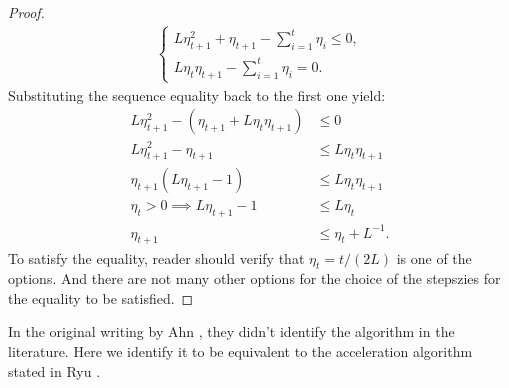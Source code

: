 \documentclass[12pt]{article}
\begin{document}
\begin{proof}
            \begin{align*}
                \begin{cases}
                    L\eta_{t + 1}^2 + \eta_{t + 1} - \sum_{i = 1}^{t}\eta_i 
                    \le 0, 
                    \\
                    L\eta_t \eta_{t + 1} - \sum_{i = 1}^{t} \eta_i 
                    = 0. 
                \end{cases}
            \end{align*}
            Substituting the sequence equality back to the first one yield: 
            \begin{align*}
                L\eta_{t + 1}^2 - (\eta_{t + 1} + L\eta_t\eta_{t + 1}) &\le 0 
                \\
                L\eta^2_{t + 1} - \eta_{t + 1}
                &\le 
                L\eta_t \eta_{t + 1} 
                \\
                \eta_{t + 1}(L\eta_{t + 1} - 1) 
                &\le L\eta_t\eta_{t + 1}
                \\
                \eta_t > 0 
                \implies 
                L\eta_{t + 1} - 1 &\le 
                L\eta_t 
                \\
                \eta_{t + 1} &\le \eta_t + L^{-1}. 
            \end{align*}
            To satisfy the equality, reader should verify that $\eta_{t} = t/(2L)$ is one of the options. 
            And there are not many other options for the choice of the stepszies for the equality to be satisfied. 
        \end{proof}
        \begin{remark}
            In the original writing by Ahn \cite[equation (4.9)]{ahn_understanding_2022}, they didn't identify the algorithm in the literature. 
            Here we identify it to be equivalent to the acceleration algorithm stated in Ryu \cite[algorithm 12.1]{ryu_large-scale_2022}. 
        \end{remark}
\end{document}
